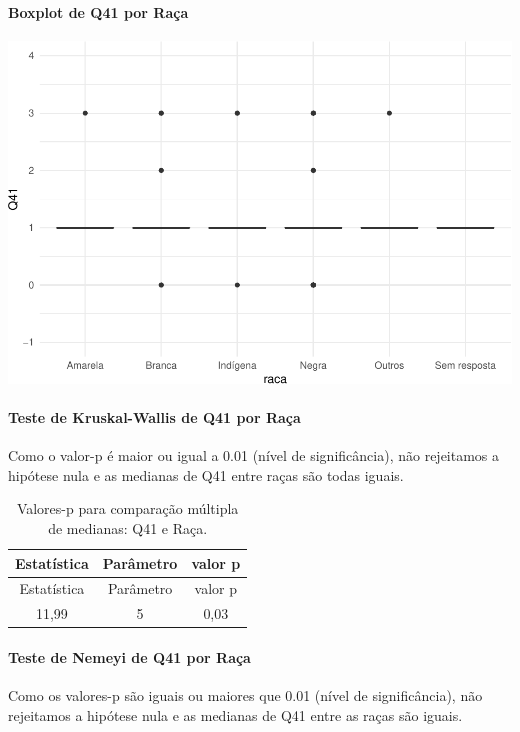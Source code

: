 \documentclass[]{article}
\let\oldparagraph\paragraph
\renewcommand{\paragraph}[1]{\oldparagraph{#1}\mbox{}}
\begin{document}
\hypertarget{boxplot-de-q41-por-rauxe7a}{%
\paragraph{Boxplot de Q41 por Raça}\label{boxplot-de-q41-por-rauxe7a}}

\begin{center}\includegraphics[width=0.75\linewidth]{relatorio_covid19_files/figure-latex/unnamed-chunk-1640-1} \end{center}

\hypertarget{teste-de-kruskal-wallis-de-q41-por-rauxe7a}{%
\paragraph{Teste de Kruskal-Wallis de Q41 por Raça}\label{teste-de-kruskal-wallis-de-q41-por-rauxe7a}}

Como o valor-p é maior ou igual a 0.01 (nível de significância), não rejeitamos a hipótese nula e as medianas de Q41 entre raças são todas iguais.

\begin{longtable}[]{@{}ccc@{}}
\caption{\label{tab:unnamed-chunk-1642}Valores-p para comparação múltipla de medianas: Q41 e Raça.}\tabularnewline
\toprule
Estatística & Parâmetro & valor p\tabularnewline
\midrule
\endfirsthead
\toprule
Estatística & Parâmetro & valor p\tabularnewline
\midrule
\endhead
11,99 & 5 & 0,03\tabularnewline
\bottomrule
\end{longtable}

\hypertarget{teste-de-nemeyi-de-q41-por-rauxe7a}{%
\paragraph{Teste de Nemeyi de Q41 por Raça}\label{teste-de-nemeyi-de-q41-por-rauxe7a}}

Como os valores-p são iguais ou maiores que 0.01 (nível de significância), não rejeitamos a hipótese nula e as medianas de Q41 entre as raças são iguais.
\end{document}
